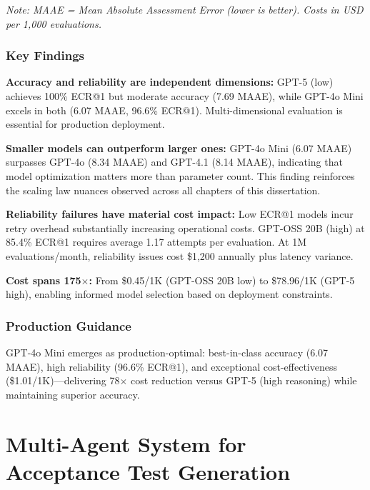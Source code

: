 \textit{Note: MAAE = Mean Absolute Assessment Error (lower is better). Costs in USD per 1,000 evaluations.}

\subsubsection{Key Findings}

\textbf{Accuracy and reliability are independent dimensions:} GPT-5 (low) achieves 100\% ECR@1 but moderate accuracy (7.69 MAAE), while GPT-4o Mini excels in both (6.07 MAAE, 96.6\% ECR@1). Multi-dimensional evaluation is essential for production deployment.

\textbf{Smaller models can outperform larger ones:} GPT-4o Mini (6.07 MAAE) surpasses GPT-4o (8.34 MAAE) and GPT-4.1 (8.14 MAAE), indicating that model optimization matters more than parameter count. This finding reinforces the scaling law nuances observed across all chapters of this dissertation.

\textbf{Reliability failures have material cost impact:} Low ECR@1 models incur retry overhead substantially increasing operational costs. GPT-OSS 20B (high) at 85.4\% ECR@1 requires average 1.17 attempts per evaluation. At 1M evaluations/month, reliability issues cost \$1,200 annually plus latency variance.

\textbf{Cost spans 175$\times$:} From \$0.45/1K (GPT-OSS 20B low) to \$78.96/1K (GPT-5 high), enabling informed model selection based on deployment constraints.

\subsubsection{Production Guidance}

GPT-4o Mini emerges as production-optimal: best-in-class accuracy (6.07 MAAE), high reliability (96.6\% ECR@1), and exceptional cost-effectiveness (\$1.01/1K)---delivering 78$\times$ cost reduction versus GPT-5 (high reasoning) while maintaining superior accuracy.


\section{Multi-Agent System for Acceptance Test Generation}
\label{sec:cmas4g2}

